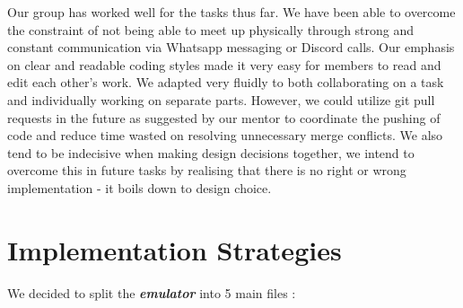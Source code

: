 \documentclass[11pt]{article}
\begin{document}
Our group has worked well for the tasks thus far. We have been able to overcome the constraint of not being able to meet up physically through strong and constant communication via Whatsapp messaging or Discord calls. Our emphasis on clear and readable coding styles made it very easy for members to read and edit each other’s work. We adapted very fluidly to both collaborating on a task and individually working on separate parts. However, we could utilize git pull requests in the future as suggested by our mentor to coordinate the pushing of code and reduce time wasted on resolving unnecessary merge conflicts. We also tend to be indecisive when making design decisions together, we intend to overcome this in future tasks by realising that there is no right or wrong implementation - it boils down to design choice. 


\section{Implementation Strategies}

We decided to split the \textbf{\emph{emulator}} into 5 main files :
\end{document}
